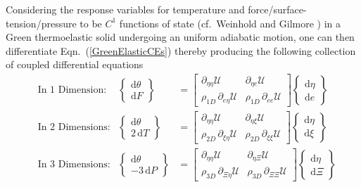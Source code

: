 Considering the response variables for temperature and force\slash surface-tension\slash pressure to be $C^1$ functions of state (cf.\ Weinhold \cite{Weinhold75c} and Gilmore \cite{Gilmore84}) in a Green thermo\-elastic solid undergoing an uniform adiabatic motion, one can then differentiate Eqn.~(\ref{GreenElasticCEs}) thereby producing the following collection of coupled differential equations
\begin{subequations}
    \label{GreenElasticODEs}
    \begin{align}
    \mbox{} & \text{In 1 Dimension:} &
    \left\{ \begin{matrix} \mathrm{d} \theta \\ 
    \mathrm{d} F \end{matrix} \right\} & = \begin{bmatrix}
    \partial_{\eta\eta} \mathcal{U} & \partial_{\eta e} \mathcal{U} \\
    \rho_{1D} \, \partial_{e\eta} \mathcal{U} & \rho_{1D} \, \partial_{ee} \mathcal{U} \end{bmatrix} 
    \left\{ \begin{matrix} \mathrm{d} \eta \\
    \mathrm{d} e \end{matrix} \right\} \\
    \mbox{} & \text{In 2 Dimensions:} &
    \left\{ \begin{matrix} \mathrm{d} \theta \\ 
    2 \, \mathrm{d} T \end{matrix} \right\} & = \begin{bmatrix}
    \partial_{\eta\eta} \mathcal{U} & \partial_{\eta \xi} \mathcal{U} \\
    \rho_{2D} \, \partial_{\xi\eta} \mathcal{U} & \rho_{2D} \, \partial_{\xi\xi} \mathcal{U} \end{bmatrix} \left\{ \begin{matrix} \mathrm{d} \eta \\
    \mathrm{d} \xi \end{matrix} \right\} \label{GreenMembrane} \\
    \mbox{} & \text{In 3 Dimensions:} &
    \left\{ \begin{matrix} \mathrm{d} \theta \\ 
    -3 \, \mathrm{d} P \end{matrix} \right\} & = \begin{bmatrix}
    \partial_{\eta\eta} \mathcal{U} & \partial_{\eta \Xi} \mathcal{U} \\
    \rho_{3D} \, \partial_{\Xi\eta} \mathcal{U} & \rho_{3D} \, \partial_{\Xi\Xi} \mathcal{U} \end{bmatrix} \left\{ \begin{matrix} \mathrm{d} \eta \\
    \mathrm{d} \Xi \end{matrix} \right\}
    \end{align}
\end{subequations}
